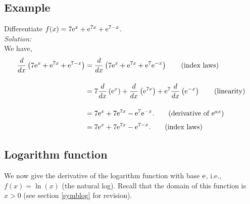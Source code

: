 \subsection{Example}  \label{ex12.101}
Differentiate $f(x) = 7\mathrm{e}^x + \mathrm{e}^{7x} + \mathrm{e}^{7-x}$. \\

\noindent \textit{Solution:} \\
We have,
\begin{align*}
\frac{d}{dx}\brac{7\e^x + \e^{7x} + \e^{7-x}} & = \frac{d}{dx}\brac{7\e^x + \e^{7x} + \e^{7}\e^{-x}} \tag{index laws} \bsk
& =  7\frac{d}{dx}\brac{\e^x} + \frac{d}{dx}\brac{\e^{7x}} + \e^7\frac{d}{dx}\brac{\e^{-x}} \tag{linearity} \bsk
	& = 7\e^x + 7\e^{7x} - \e^7\e^{-x}. \tag{derivative of $\e^{ax}$} \ssk
	& = 7\e^x + 7\e^{7x} - \e^{7-x}. \tag{index laws}
\end{align*}

\subsection{Logarithm function} \label{log no proof}
We now give the derivative of the logarithm function with base $\mathrm{e}$, i.e., $f(x) = \ln(x)$ (the natural log). Recall that the domain of this function is $x > 0$ (see section \ref{symblog} for revision). 

  	\bigskip
	
	\hfil{}
	\bigskip
	\bigskip

